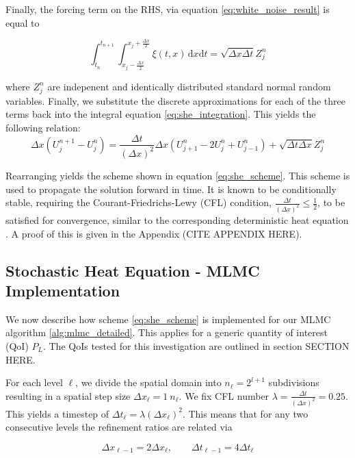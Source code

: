 Finally, the forcing term on the RHS, via equation \eqref{eq:white_noise_result} is equal to

\begin{equation}
\int_{t_n}^{t_{n+1}} \int_{x_j-\frac{\Delta x}{2}}^{x_j+\frac{\Delta x}{2}} \xi(t,x) \,\mathrm{d}x\mathrm{d}t = \sqrt{\Delta x \Delta t} Z_j^n
\end{equation}

where $Z_j^n$ are indepenent and identically distributed standard normal random variables.
Finally, we substitute the discrete approximations for each of the three terms back into the 
integral equation \eqref{eq:she_integration}. This yields the following relation:
\begin{equation*}
    \Delta x (U_j^{n+1} - U_j^n) = 
    \frac{\Delta t}{(\Delta x)^2} \Delta x (U_{j+1}^n - 2U_j^n + U_{j-1}^n) + 
    \sqrt{\Delta t \Delta x} Z_j^n
\end{equation*}

Rearranging yields the scheme shown in equation \eqref{eq:she_scheme}.
This scheme is used to propagate the solution forward in time. It is known to 
be conditionally stable, requiring the Courant-Friedrichs-Lewy (CFL) condition, 
$\frac{\Delta t}{(\Delta x)^2} \le \frac{1}{2}$, to be satisfied for convergence, 
similar to the corresponding deterministic heat equation \cite{suli2025nspdes}. 
A proof of this is given in the Appendix (CITE APPENDIX HERE).

\subsection{Stochastic Heat Equation - MLMC Implementation}

We now describe how scheme \eqref{eq:she_scheme} is implemented for our MLMC
algorithm \ref{alg:mlmc_detailed}. This applies for a generic quantity of interest
(QoI) $P_L$. The QoIs tested for this investigation are outlined in section SECTION HERE.

For each level $\ell$, we divide the spatial domain into $n_{\ell} = 2^{l+1}$ subdivisions
resulting in a spatial step size $\Delta x_\ell = 1 \ n_\ell$. We fix CFL number $\lambda = 
\frac{\Delta t}{(\Delta x)^2} = 0.25$. This yields a timestep of 
$\Delta t_\ell = \lambda (\Delta x_\ell)^2$. This means that for any two 
consecutive levels the refinement ratios are related via

\begin{equation}\label{eq:she_discrete_relations}
    \Delta x_{\ell - 1} = 2\Delta x_\ell, \qquad \Delta t_{\ell - 1} = 4 \Delta t_\ell
\end{equation}

